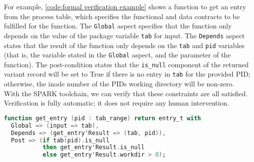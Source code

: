 For example, \autoref{code:formal verification example} shows a function to get an entry from the process table, which specifies the functional and data contracts to be fulfilled for the function.
The \lstinline[language=Ada]{Global} aspect specifies that the function only depends on the value of the package variable \lstinline[language=Ada]{tab} for input.
The \lstinline[language=Ada]{Depends} aspect states that the result of the function only depends on the \lstinline[language=Ada]{tab} and \lstinline[language=Ada]{pid} variables (that is, the variable stated in the \lstinline[language=Ada]{Global} aspect, and the parameter of the function).
The post-condition states that the \lstinline[language=Ada]{is_null} component of the returned variant record will be set to True if there is no entry in \lstinline[language=Ada]{tab} for the provided PID; otherwise, the inode number of the PIDs working directory will be non-zero.
With the SPARK toolchain, we can verify that these constraints are all satisfied.
Verification is fully automatic; it does not require any human intervention.

\begin{lstlisting}[float=tb,caption={Functional and data contracts}, label={code:formal verification example}, language=Ada]
function get_entry (pid : tab_range) return entry_t with
  Global => (input => tab),
  Depends => (get_entry'Result => (tab, pid)),
  Post => (if tab(pid).is_null
           then get_entry'Result.is_null
           else get_entry'Result.workdir > 0);
\end{lstlisting}
